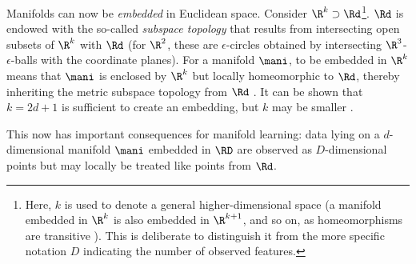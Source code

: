 Manifolds can now be \textit{embedded} in Euclidean space.
Consider $\R^k \supset \Rd$\footnote{
Here, $k$ is used to denote a general higher-dimensional space (a manifold
embedded in $\R^k$ is also embedded in $\R^{k + 1}$, and so on, as 
homeomorphisms are transitive \citep{waldmann2014}). 
This is deliberate to distinguish it from the more specific notation $D$ 
indicating the number of observed features.
}.
$\Rd$ is endowed with the so-called \textit{subspace topology} that results
from intersecting open subsets of $\R^k$ with $\Rd$ (for $\R^2$, these are
$\epsilon$-circles obtained by intersecting $\R^3$-$\epsilon$-balls with the 
coordinate planes).
For a manifold $\mani$, to be embedded in $\R^k$ means that $\mani$ is enclosed
by $\R^k$ but locally homeomorphic to $\Rd$, thereby inheriting the metric
subspace topology from $\Rd$ \citep{waldmann2014}.
It can be shown that $k = 2d + 1$ is sufficient to create an embedding, but $k$
may be smaller \citep{mafu2011}.

This now has important consequences for manifold learning: data lying on a 
$d$-dimensional manifold $\mani$ embedded in $\RD$ are observed as 
$D$-dimensional points but may locally be treated like points from $\Rd$.
\\

